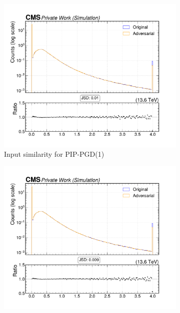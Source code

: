 \begin{figure}[htbp]
  \centering
  \begin{subfigure}[t]{0.32\textwidth}
    \includegraphics[width=\linewidth]{media/output/features/compare/combined_it_1/cmp_cpf_arr_Cpfcan_BtagPf_trackPtRel.pdf}
    \caption*{Input similarity for PIP-PGD(1)}
  \end{subfigure}\hfill
  \begin{subfigure}[t]{0.32\textwidth}
    \includegraphics[width=\linewidth]{media/output/features/compare/combined_it_2/cmp_cpf_arr_Cpfcan_BtagPf_trackPtRel.pdf}

\end{subfigure}
\end{figure}

